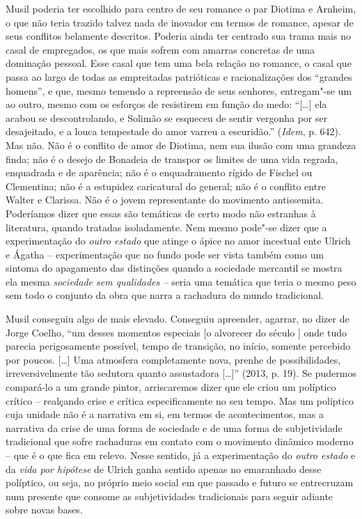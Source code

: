 Musil poderia ter escolhido para centro de seu romance o par Diotima e
Arnheim, o que não teria trazido talvez nada de inovador em termos de
romance, apesar de seus conflitos belamente descritos. Poderia ainda ter
centrado sua trama mais no casal de empregados, os que mais sofrem com
amarras concretas de uma dominação pessoal. Esse casal que tem uma bela
relação no romance, o casal que passa ao largo de todas as empreitadas
patrióticas e racionalizações dos ``grandes homens'', e que, mesmo
temendo a repreensão de seus senhores, entregam"-se um ao outro, mesmo
com os esforços de resistirem em função do medo: ``[\ldots{}] ela acabou
se descontrolando, e Solimão se esqueceu de sentir vergonha por ser
desajeitado, e a louca tempestade do amor varreu a escuridão.''
(\emph{Idem}, p. 642). Mas não. Não é o conflito de amor de Diotima, nem
sua ilusão com uma grandeza finda; não é o desejo de Bonadeia de
transpor os limites de uma vida regrada, enquadrada e de aparência; não
é o enquadramento rígido de Fischel ou Clementina; não é a estupidez
caricatural do general; não é o conflito entre Walter e Clarissa. Não é
o jovem representante do movimento antissemita. Poderíamos dizer que
essas são temáticas de certo modo não estranhas à literatura, quando
tratadas isoladamente. Nem mesmo pode"-se dizer que a experimentação do
\emph{outro estado} que atinge o ápice no amor incestual ente Ulrich e
Ágatha -- experimentação que no fundo pode ser vista também como um
sintoma do apagamento das distinções quando a sociedade mercantil se
mostra ela mesma \emph{sociedade sem qualidades --} seria uma temática
que teria o mesmo peso sem todo o conjunto da obra que narra a rachadura
do mundo tradicional.

Musil conseguiu algo de mais elevado. Conseguiu apreender, agarrar, no
dizer de Jorge Coelho, ``um desses momentos especiais [o alvorecer do
século ] onde tudo parecia perigosamente possível, tempo de
transição, no início, somente percebido por poucos. [\ldots{}] Uma
atmosfera completamente nova, prenhe de possibilidades,
irreversivelmente tão sedutora quanto assustadora [\ldots{}]'' (2013, p.
19). Se pudermos compará-lo a um grande pintor, arriscaremos dizer que
ele criou um políptico crítico -- realçando crise e crítica
especificamente no seu tempo. Mas um políptico cuja unidade não é a
narrativa em si, em termos de acontecimentos, mas a narrativa da crise
de uma forma de sociedade e de uma forma de subjetividade tradicional
que sofre rachaduras em contato com o movimento dinâmico moderno -- que
é o que fica em relevo. Nesse sentido, já a experimentação do
\emph{outro estado} e da \emph{vida por hipótese} de Ulrich ganha
sentido apenas no emaranhado desse políptico, ou seja, no próprio meio
social em que passado e futuro se entrecruzam num presente que consome
as subjetividades tradicionais para seguir adiante sobre novas bases.


